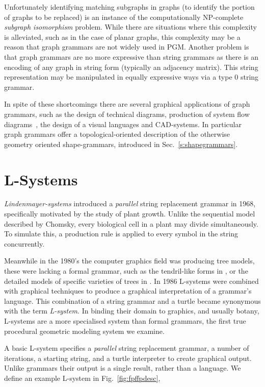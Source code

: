 Unfortunately identifying matching subgraphs in graphs (to identify the portion of graphs to be replaced) is an instance of the computationally NP-complete \emph{subgraph isomorphism} problem. While there are situations where this complexity is alleviated, such as in the case of planar graphs\cite{Eppstein95}, this complexity may be a reason that graph grammars are not widely used in PGM. Another problem is that graph grammars are no more expressive than string grammars as there is an encoding of any graph in string form (typically an adjacency matrix). This string representation may be manipulated in equally expressive ways via a type 0 string grammar.

In spite of these shortcomings there are several graphical applications of graph grammars, such as the design of technical diagrams\cite{Gottler83}, production of system flow diagrams~\cite{Dolado88}, the design of a visual languages\cite{Gottler89} and CAD-systems\cite{Gottler91}. In particular graph grammars offer a topological-oriented description of the otherwise geometry oriented shape-grammars\cite{Yue09}, introduced in Sec.~\ref{s:shapegrammars}.

\section{L-Systems}
\label{s:lsystems}

\emph{Lindenmayer-systems}\cite{Linden68} introduced a \emph{parallel} string replacement grammar in 1968, specifically motivated by the study of plant growth. Unlike the sequential model described by Chomsky, every biological cell in a plant may divide simultaneously. To simulate this, a production rule is applied to every symbol in the string concurrently.

Meanwhile in the 1980's the computer graphics field was producing tree models, these were lacking a formal grammar, such as the tendril-like forms in \cite{Kawaguchi82}, or the detailed models of specific varieties of trees in \cite{Bloomenthal85}. In 1986 L-systems were combined with graphical techniques\cite{Prusinkiewicz86} to produce a graphical interpretation of a grammar's language. This combination of a string grammar and a turtle became synonymous with the term \emph{L-system}. In binding their domain to graphics, and usually botany, L-systems are a more specialised system than formal grammars, the first true procedural geometric modeling system we examine.

A basic L-system specifies a \emph{parallel} string replacement grammar, a number of iterations, a starting string, and a turtle interpreter to create graphical output. Unlike grammars their output is a single result, rather than a language. We define an example L-system in Fig.~\ref{fig:fpffpdesc},

